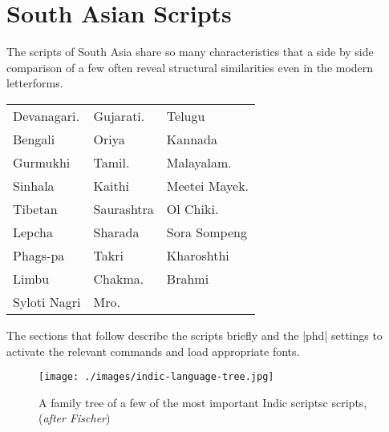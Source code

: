 
\arial


\chapter{South Asian Scripts}

The scripts of South Asia share so many characteristics that a side by side comparison of a few often reveal structural similarities even in the 
modern letterforms.
\medskip


\begin{center}
\begin{tabular}{lll}
Devanagari. &Gujarati. &Telugu\\
Bengali   &Oriya &Kannada\\
Gurmukhi &Tamil.  &Malayalam.\\
Sinhala &Kaithi  &Meetei Mayek.\\
Tibetan &Saurashtra &Ol Chiki.\\
Lepcha  &Sharada &Sora Sompeng\\
Phags-pa &Takri &Kharoshthi\\
Limbu &Chakma. & Brahmi\\
Syloti Nagri &Mro. &\\
\end{tabular}
\end{center}

The sections that follow describe the scripts briefly and the |phd| settings
to activate the relevant commands and load appropriate fonts. 

\begin{figure}[htbp]
\texttt{[image: ./images/indic-language-tree.jpg]}
\caption{A family tree of a few of the most important Indic scriptsc scripts, (\textit{after Fischer})\protect\cite{writing}}
\end{figure}
















